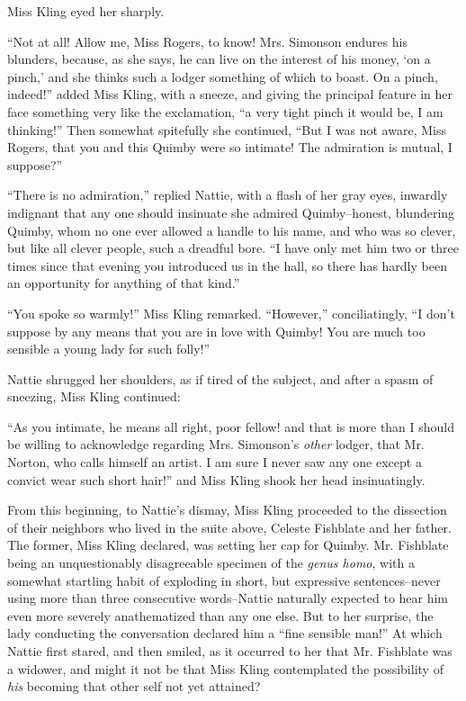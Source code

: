 Miss Kling eyed her sharply.

``Not at all! Allow me, Miss Rogers, to know! Mrs. Simonson endures his
blunders, because, as she says, he can live on the interest of his
money, `on a pinch,' and she thinks such a lodger something of which to
boast. On a pinch, indeed!'' added Miss Kling, with a sneeze, and giving
the principal feature in her face something very like the exclamation,
``a very tight pinch it would be, I am thinking!'' Then somewhat
spitefully she continued, ``But I was not aware, Miss Rogers, that you
and this Quimby were so intimate! The admiration is mutual, I suppose?''

``There is no admiration,'' replied Nattie, with a flash of her gray eyes,
inwardly indignant that any one should insinuate she admired
Quimby--honest, blundering Quimby, whom no one ever allowed a handle to
his name, and who was so clever, but like all clever people, such a
dreadful bore. ``I have only met him two or three times since that
evening you introduced us in the hall, so there has hardly been an
opportunity for anything of that kind.''

``You spoke so warmly!'' Miss Kling remarked. ``However,'' conciliatingly,
``I don't suppose by any means that you are in love with Quimby! You are
much too sensible a young lady for such folly!''

Nattie shrugged her shoulders, as if tired of the subject, and after a
spasm of sneezing, Miss Kling continued:

``As you intimate, he means all right, poor fellow! and that is more than
I should be willing to acknowledge regarding Mrs. Simonson's \emph{other}
lodger, that Mr. Norton, who calls himself an artist. I am sure I never
saw any one except a convict wear such short hair!'' and Miss Kling shook
her head insinuatingly.

From this beginning, to Nattie's dismay, Miss Kling proceeded to the
dissection of their neighbors who lived in the suite above, Celeste
Fishblate and her father. The former, Miss Kling declared, was setting
her cap for Quimby. Mr. Fishblate being an unquestionably disagreeable
specimen of the \emph{genus homo}, with a somewhat startling habit of exploding
in short, but expressive sentences--never using more than three
consecutive words--Nattie naturally expected to hear him even more
severely anathematized than any one else. But to her surprise, the lady
conducting the conversation declared him a ``fine sensible man!'' At which
Nattie first stared, and then smiled, as it occurred to her that Mr.
Fishblate was a widower, and might it not be that Miss Kling
contemplated the possibility of \emph{his} becoming that other self not yet
attained?

